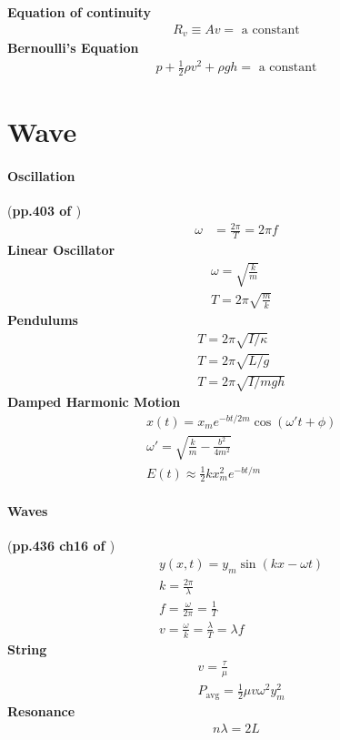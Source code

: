 \documentclass{article}
\numberwithin{equation}{subsection} %
\theoremstyle{definition}
\begin{document}
\textbf{Equation of continuity}
\begin{align}
    R_v \equiv Av = \text{ a constant}
\end{align}
\textbf{Bernoulli's Equation}
\begin{align}
    p + \frac{1}{2}\rho v^2 + \rho gh = \text{ a constant}
\end{align}

\section{Wave}
\label{sec:Wave}

\paragraph{Oscillation} (\textbf{pp.403 of \cite{book}})
\begin{align}
    \omega &= \frac{2\pi}{T} = 2\pi f
\end{align}
\textbf{Linear Oscillator}
\begin{align}
    & \omega = \sqrt{\frac{k}{m}} \\
    & T = 2\pi \sqrt{\frac{m}{k}} 
\end{align}
\textbf{Pendulums}
\begin{align}
    & T = 2\pi \sqrt{I/\kappa} \\
    & T = 2\pi \sqrt{L/g} \\
    & T = 2\pi \sqrt{I/mgh}
\end{align}
\textbf{Damped Harmonic Motion}
\begin{align}
    & x(t) = x_m e^{-bt/2m} \cos\left( \omega' t+\phi\right) \\
    & \omega' = \sqrt{ \frac{k}{m} - \frac{b^2}{4m^2} } \\
    & E(t)\approx \frac{1}{2} kx_m^2 e^{-bt/m}
\end{align}


\paragraph{Waves} (\textbf{pp.436 ch16 of \cite{book}})
\begin{align}
    & y(x,t) = y_m \sin(kx-\omega t) \\
    & k = \frac{2\pi}{\lambda} \\
    & f = \frac{\omega}{2\pi} = \frac{1}{T} \\
    & v = \frac{\omega}{k} = \frac{\lambda}{T} = \lambda f
\end{align}
\textbf{String}
\begin{align}
    & v = \frac{\tau}{\mu} \\
    & P_\text{avg} = \frac{1}{2}\mu v \omega^2 y_m^2
\end{align}
\textbf{Resonance}
\begin{align}
    n \lambda = 2L
\end{align}
\end{document}
